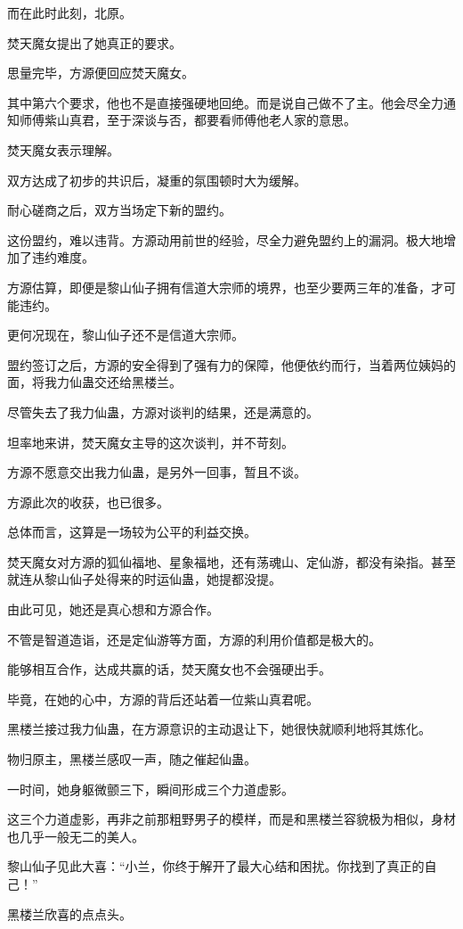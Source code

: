 \begin{this_body}
而在此时此刻，北原。

焚天魔女提出了她真正的要求。

思量完毕，方源便回应焚天魔女。

其中第六个要求，他也不是直接强硬地回绝。而是说自己做不了主。他会尽全力通知师傅紫山真君，至于深谈与否，都要看师傅他老人家的意思。

焚天魔女表示理解。

双方达成了初步的共识后，凝重的氛围顿时大为缓解。

耐心磋商之后，双方当场定下新的盟约。

这份盟约，难以违背。方源动用前世的经验，尽全力避免盟约上的漏洞。极大地增加了违约难度。

方源估算，即便是黎山仙子拥有信道大宗师的境界，也至少要两三年的准备，才可能违约。

更何况现在，黎山仙子还不是信道大宗师。

盟约签订之后，方源的安全得到了强有力的保障，他便依约而行，当着两位姨妈的面，将我力仙蛊交还给黑楼兰。

尽管失去了我力仙蛊，方源对谈判的结果，还是满意的。

坦率地来讲，焚天魔女主导的这次谈判，并不苛刻。

方源不愿意交出我力仙蛊，是另外一回事，暂且不谈。

方源此次的收获，也已很多。

总体而言，这算是一场较为公平的利益交换。

焚天魔女对方源的狐仙福地、星象福地，还有荡魂山、定仙游，都没有染指。甚至就连从黎山仙子处得来的时运仙蛊，她提都没提。

由此可见，她还是真心想和方源合作。

不管是智道造诣，还是定仙游等方面，方源的利用价值都是极大的。

能够相互合作，达成共赢的话，焚天魔女也不会强硬出手。

毕竟，在她的心中，方源的背后还站着一位紫山真君呢。

黑楼兰接过我力仙蛊，在方源意识的主动退让下，她很快就顺利地将其炼化。

物归原主，黑楼兰感叹一声，随之催起仙蛊。

一时间，她身躯微颤三下，瞬间形成三个力道虚影。

这三个力道虚影，再非之前那粗野男子的模样，而是和黑楼兰容貌极为相似，身材也几乎一般无二的美人。

黎山仙子见此大喜：“小兰，你终于解开了最大心结和困扰。你找到了真正的自己！”

黑楼兰欣喜的点点头。


\end{this_body}
